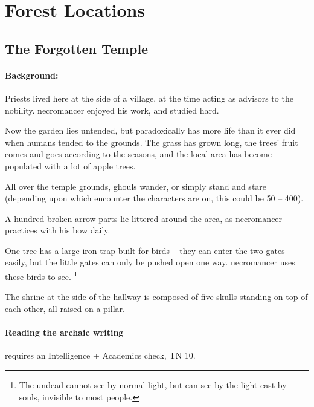 \section{Forest Locations}

\begin{multicols}{2}

\subsection{The Forgotten Temple}\label{necromancers_lair}


\paragraph{Background:}
Priests lived here at the side of a village, at the time acting as advisors to the nobility.
\Gls{necromancer} enjoyed his work, and studied hard.

Now the garden lies untended, but paradoxically has more life than it ever did when humans tended to the grounds.
The grass has grown long, the trees' fruit comes and goes according to the seasons, and the local area has become populated with a lot of apple trees.


All over the temple grounds, ghouls wander, or simply stand and stare
(depending upon which encounter the characters are on, this could be 50 -- 400).

A hundred broken arrow parts lie littered around the area, as \gls{necromancer} practices with his bow daily.

One tree has a large iron trap built for birds -- they can enter the two gates easily, but the little gates can only be pushed open one way.
\Gls{necromancer} uses these birds to see.%
\footnote{The undead cannot see by normal light, but can see by the light cast by souls, invisible to most people.}



The shrine at the side of the hallway is composed of five skulls standing on top of each other, all raised on a pillar.

\paragraph{Reading the archaic writing}
requires an Intelligence + Academics check, TN 10.


\end{multicols}
